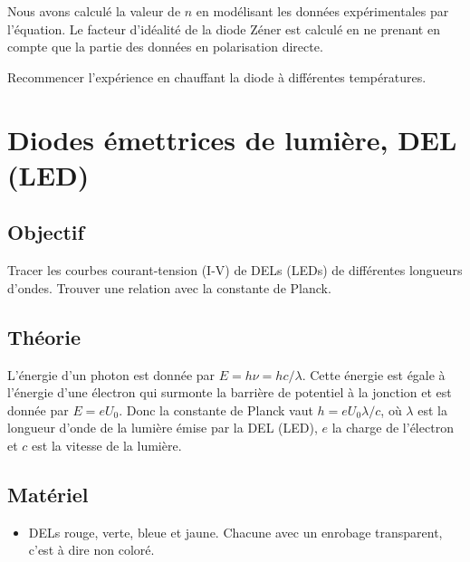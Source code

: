 \documentclass{book}
\begin{document}
Nous avons calculé la valeur de $n$  en modélisant les données expérimentales par l'équation. Le facteur d'idéalité de la diode Zéner est calculé en ne prenant en compte que la partie des données en polarisation directe.



Recommencer l'expérience en chauffant la diode à différentes températures.







\section{Diodes émettrices de lumière, DEL (LED)}



\subsection{Objectif}


Tracer les courbes courant-tension (I-V) de DELs (LEDs) de différentes longueurs d'ondes. Trouver une relation avec la constante de Planck.

\subsection{Théorie}


L'énergie d'un photon est donnée par $E=h\nu=hc/\lambda$. Cette énergie est égale à l'énergie d'une électron qui surmonte la barrière de potentiel à la jonction et est donnée par $E=eU_{0}$. Donc la constante de Planck vaut $h=eU_{0}\lambda/c$, où $\lambda$ est  la longueur d'onde de la lumière émise par la DEL (LED), $e$  la charge de l'électron et $c$ est  la vitesse de la lumière.

\subsection{Matériel}


\begin{itemize}
  \item DELs rouge, verte, bleue et jaune. Chacune avec un enrobage transparent, c'est à dire non coloré.
\end{itemize}
\end{document}
